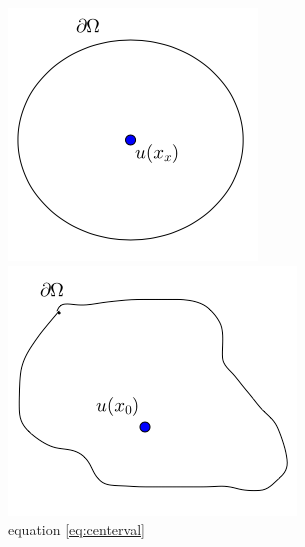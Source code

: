 \begin{figure}[!htb]
  \includegraphics[width=\linewidth]{styles/CircCenter}
  \caption{equation \ref{eq:centerval}}\label{fig:circcenter}
\endminipage\hfill
{}
  \vspace{1.7mm}
  \includegraphics[width=\linewidth]{styles/GeneralOffset}

\end{figure}
